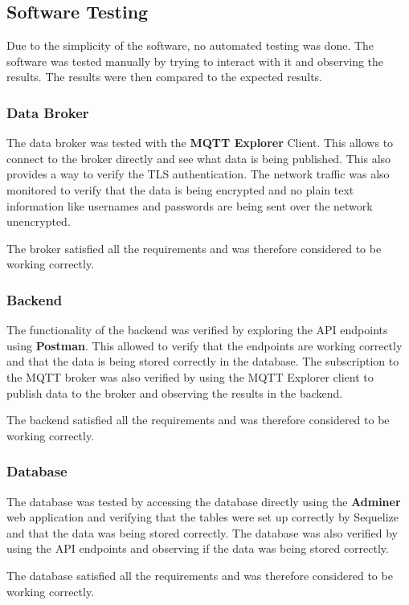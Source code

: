 \subsection{Software Testing}
Due to the simplicity of the software, no automated testing was done. The software was tested manually by trying to interact with it and observing the results. The results were then compared to the expected results.

\subsubsection{Data Broker}
The data broker was tested with the \textbf{MQTT Explorer} \Gls{Client}. This allows to connect to the broker directly and see what data is being published. This also provides a way to verify the TLS authentication. The network traffic was also monitored to verify that the data is being encrypted and no plain text information like usernames and passwords are being sent over the network unencrypted.

The broker satisfied all the requirements and was therefore considered to be working correctly.

\subsubsection{Backend}
The functionality of the backend was verified by exploring the API endpoints using \textbf{Postman}. This allowed to verify that the endpoints are working correctly and that the data is being stored correctly in the database. The subscription to the MQTT broker was also verified by using the MQTT Explorer client to publish data to the broker and observing the results in the backend.

The backend satisfied all the requirements and was therefore considered to be working correctly.

\subsubsection{Database}
The database was tested by accessing the database directly using the \textbf{Adminer} web application and verifying that the tables were set up correctly by Sequelize and that the data was being stored correctly. The database was also verified by using the API endpoints and observing if the data was being stored correctly.

The database satisfied all the requirements and was therefore considered to be working correctly.

